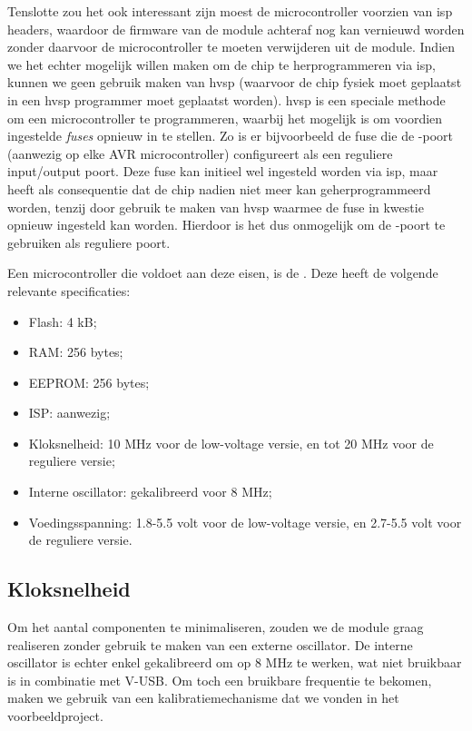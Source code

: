 Tenslotte zou het ook interessant zijn moest de microcontroller voorzien van \ac{isp} headers, waardoor de firmware van de module achteraf nog kan vernieuwd worden zonder daarvoor de microcontroller te moeten verwijderen uit de module. Indien we het echter mogelijk willen maken om de chip te herprogrammeren via \ac{isp}, kunnen we geen gebruik maken van \ac{hvsp} (waarvoor de chip fysiek moet geplaatst in een \ac{hvsp} programmer moet geplaatst worden). \ac{hvsp} is een speciale methode om een microcontroller te programmeren, waarbij het mogelijk is om voordien ingestelde \emph{fuses} opnieuw in te stellen. Zo is er bijvoorbeeld de fuse die de -poort (aanwezig op elke AVR microcontroller) configureert als een reguliere input/output poort. Deze fuse kan initieel wel ingesteld worden via \ac{isp}, maar heeft als consequentie dat de chip nadien niet meer kan geherprogrammeerd worden, tenzij door gebruik te maken van \ac{hvsp} waarmee de fuse in kwestie opnieuw ingesteld kan worden. Hierdoor is het dus onmogelijk om de -poort te gebruiken als reguliere poort.

Een microcontroller die voldoet aan deze eisen, is de . Deze heeft de volgende relevante specificaties:
\begin{itemize}
\item Flash: 4 kB;
\item RAM: 256 bytes;
\item EEPROM: 256 bytes;
\item ISP: aanwezig;
\item Kloksnelheid: 10 MHz voor de low-voltage versie, en tot 20 MHz voor de reguliere versie;
\item Interne oscillator: gekalibreerd voor 8 MHz;
\item Voedingsspanning: 1.8-5.5 volt voor de low-voltage versie, en 2.7-5.5 volt voor de reguliere versie.
\end{itemize}

\subsection{Kloksnelheid}

Om het aantal componenten te minimaliseren, zouden we de module graag realiseren zonder gebruik te maken van een externe oscillator. De interne oscillator is echter enkel gekalibreerd om op 8 MHz te werken, wat niet bruikbaar is in combinatie met V-USB. Om toch een bruikbare frequentie te bekomen, maken we gebruik van een kalibratiemechanisme dat we vonden in het  voorbeeldproject.

